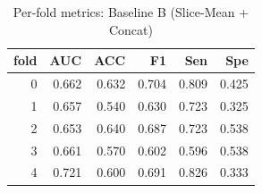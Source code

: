 \begin{table}[H]
\centering
\small
\caption{Per-fold metrics: Baseline B (Slice-Mean + Concat)}
\label{tab:baseline_b_slice_mean_concat_per_fold}
\begin{tabular}{rrrrrr}
\toprule
fold & AUC & ACC & F1 & Sen & Spe \\
\midrule
0 & 0.662 & 0.632 & 0.704 & 0.809 & 0.425 \\
1 & 0.657 & 0.540 & 0.630 & 0.723 & 0.325 \\
2 & 0.653 & 0.640 & 0.687 & 0.723 & 0.538 \\
3 & 0.661 & 0.570 & 0.602 & 0.596 & 0.538 \\
4 & 0.721 & 0.600 & 0.691 & 0.826 & 0.333 \\
\bottomrule
\end{tabular}
\end{table}
